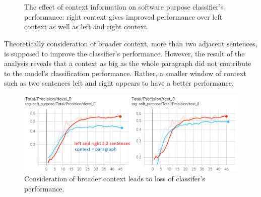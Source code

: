 \begin{figure}[h]
	
	\myfloatalign
	
	 \\
	\\
	\caption{The effect of context information on software purpose classifier's performance: right context gives improved performance over left context as well as left and right context.}
\end{figure}

Theoretically consideration of broader context, more than two adjacent sentences, is supposed to improve the classifier’s performance. However, the result of the analysis reveals that a context as big as the whole paragraph did not contribute to the model’s classification performance. Rather, a smaller window of context such as two sentences left and right appears to have a better performance. 

\begin{figure}[htbp]
	\centering
	\includegraphics[width=.90\textwidth]{4.graphics/figures/ch_6/3.paragraph_context_vs_22/HD/1}
	\caption{Consideration of broader context leads to loss of classifer's performance.}
	\label{fig:chapter06:with}
\end{figure}


